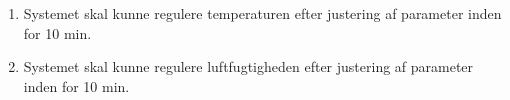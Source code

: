 
\begin{enumerate}
 \item Systemet skal kunne regulere temperaturen efter justering af parameter inden for 10 min. 
 \item Systemet skal kunne regulere luftfugtigheden efter justering af parameter inden for 10 min.
\end{enumerate}
\FloatBarrier